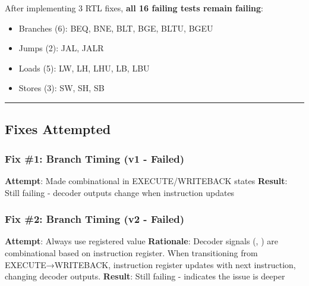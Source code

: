\begin{record}

After implementing 3 RTL fixes, \textbf{all 16 failing tests remain
failing}:

\begin{itemize}
\tightlist
\item
  \bad{} Branches (6): BEQ, BNE, BLT, BGE, BLTU, BGEU
\item
  \bad{} Jumps (2): JAL, JALR
\item
  \bad{} Loads (5): LW, LH, LHU, LB, LBU
\item
  \bad{} Stores (3): SW, SH, SB
\end{itemize}

\begin{center}\rule{0.5\linewidth}{0.5pt}\end{center}

\end{record}

\subsection{Fixes Attempted}\label{cr:fix:rtl-debug-report:fixes-attempted}

\subsubsection{Fix \#1: Branch Timing (v1 - Failed)}\label{cr:fix:rtl-debug-report:fix-1-branch-timing-v1-failed}

\begin{record}

\textbf{Attempt}: Made  combinational in
EXECUTE/\allowbreak{}WRITEBACK states \textbf{Result}: Still failing -
decoder outputs change when instruction updates

\end{record}

\subsubsection{Fix \#2: Branch Timing (v2 - Failed)}\label{cr:fix:rtl-debug-report:fix-2-branch-timing-v2-failed}

\begin{record}

\textbf{Attempt}: Always use registered 
value \textbf{Rationale}: Decoder signals (, )
are combinational based on instruction register. When transitioning from
EXECUTE→WRITEBACK, instruction register updates with next instruction,
changing decoder outputs. \textbf{Result}: Still failing - indicates the
issue is deeper

\end{record}

